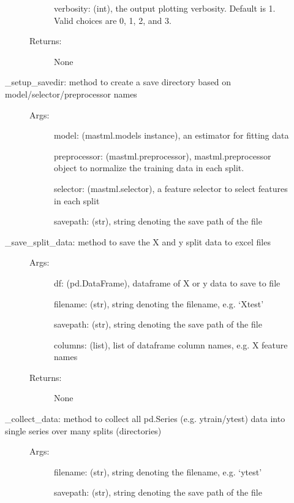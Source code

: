 \documentclass[letterpaper,10pt,english]{sphinxmanual}
\begin{document}
\begin{fulllineitems}
\begin{description}
\begin{description}
\begin{description}
verbosity: (int), the output plotting verbosity. Default is 1. Valid choices are 0, 1, 2, and 3.

\item[{Returns:}] \leavevmode
None

\end{description}

\item[{\_setup\_savedir: method to create a save directory based on model/selector/preprocessor names}] \leavevmode\begin{description}
\item[{Args:}] \leavevmode
model: (mastml.models instance), an estimator for fitting data

preprocessor: (mastml.preprocessor), mastml.preprocessor object to normalize the training data in each split.

selector: (mastml.selector), a feature selector to select features in each split

savepath: (str), string denoting the save path of the file

\end{description}

\item[{\_save\_split\_data: method to save the X and y split data to excel files}] \leavevmode\begin{description}
\item[{Args:}] \leavevmode
df: (pd.DataFrame), dataframe of X or y data to save to file

filename: (str), string denoting the filename, e.g. ‘Xtest’

savepath: (str), string denoting the save path of the file

columns: (list), list of dataframe column names, e.g. X feature names

\item[{Returns:}] \leavevmode
None

\end{description}

\item[{\_collect\_data: method to collect all pd.Series (e.g. ytrain/ytest) data into single series over many splits (directories)}] \leavevmode\begin{description}
\item[{Args:}] \leavevmode
filename: (str), string denoting the filename, e.g. ‘ytest’

savepath: (str), string denoting the save path of the file


\end{description}
\end{description}
\end{description}
\end{fulllineitems}
\end{document}

